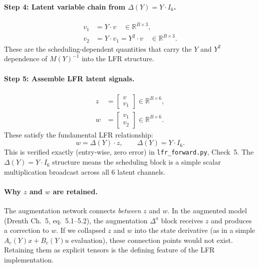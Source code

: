 \documentclass[11pt,a4paper]{article}
\newcommand{\R}{\mathbb{R}}
\newcommand{\inv}{^{-1}}
\newcommand{\pyfile}[1]{\texttt{#1}}
\begin{document}
\paragraph{Step 4: Latent variable chain from $\Delta(Y) = Y \cdot I_6$.}
\begin{align}
v_1 &= Y \cdot v \quad \in \R^{B \times 3}, \\
v_2 &= Y \cdot v_1 = Y^2 \cdot v \quad \in \R^{B \times 3}.
\end{align}
These are the scheduling-dependent quantities that carry the $Y$ and $Y^2$ dependence of
$M(Y)\inv$ into the LFR structure.

\paragraph{Step 5: Assemble LFR latent signals.}
\begin{align}
z &= \begin{bmatrix} v \\ v_1 \end{bmatrix} \in \R^{B \times 6}, \label{eq:z_def} \\
w &= \begin{bmatrix} v_1 \\ v_2 \end{bmatrix} \in \R^{B \times 6}. \label{eq:w_def}
\end{align}
These satisfy the fundamental LFR relationship:
\begin{equation}
\label{eq:delta}
\boxed{w = \Delta(Y) \cdot z, \qquad \Delta(Y) = Y \cdot I_6.}
\end{equation}
This is verified exactly (entry-wise, zero error) in \pyfile{lfr\_forward.py}, Check~5.
The $\Delta(Y) = Y \cdot I_6$ structure means the scheduling block is a simple scalar
multiplication broadcast across all 6 latent channels.

\paragraph{Why $z$ and $w$ are retained.}
The augmentation network connects \emph{between} $z$ and $w$. In the augmented model
(Drenth Ch.~5, eq.~5.1--5.2), the augmentation $\Delta^a$ block receives $z$ and produces a
correction to $w$. If we collapsed $z$ and $w$ into the state derivative (as in a simple
$A_c(Y) x + B_c(Y) u$ evaluation), these connection points would not exist. Retaining them as
explicit tensors is the defining feature of the LFR implementation.
\end{document}
